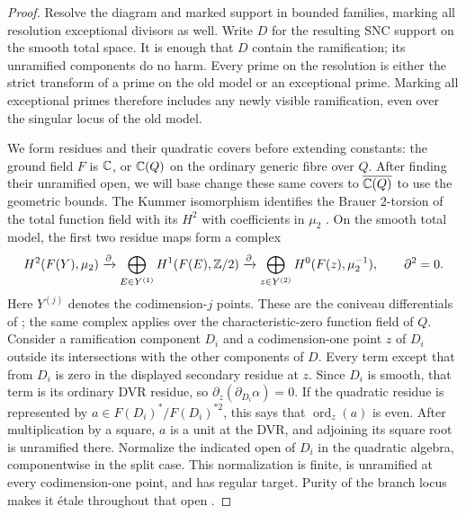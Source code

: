 \begin{proof}
Resolve the diagram and marked support in bounded families, marking all
resolution exceptional divisors as well.  Write $D$ for the resulting
SNC support on the smooth total space.  It is enough that $D$ contain
the ramification; its unramified components do no harm.  Every prime
on the resolution is either the strict transform of a prime on the
old model or an exceptional prime.  Marking all exceptional primes
therefore includes any newly visible ramification, even over the
singular locus of the old model.

We form residues and their quadratic covers before extending constants:
the ground field $F$ is $\mathbb C$, or $\mathbb C(Q)$ on the ordinary generic fibre
over $Q$.  After finding their unramified open, we will base change
these same covers to $\overline{\mathbb C(Q)}$ to use the geometric bounds.
The Kummer
isomorphism identifies the Brauer $2$-torsion of the total
function field with its $H^2$ with coefficients in $\mu_2$
\cite[\S2, equations~(1)--(4)]{AuelBohningBothmerPirutka20}.  On the
smooth total model, the first two residue maps form a complex
\[
 H^2(F(Y),\mu_2)
 \xrightarrow{\partial}
 \bigoplus_{E\in Y^{(1)}}H^1(F(E),\mathbb Z/2)
 \xrightarrow{\partial}
 \bigoplus_{z\in Y^{(2)}}H^0(F(z),\mu_2^{-1}),
 \qquad \partial^2=0.
\]
Here $Y^{(j)}$ denotes the codimension-$j$ points.  These are the
coniveau differentials of
\cite[Example~2.1 and Proposition~3.9]{BlochOgus74}; the same complex
applies over the characteristic-zero function field of $Q$.
Consider a ramification component $D_i$ and a codimension-one point
$z$ of $D_i$ outside its intersections with the other components of
$D$.  Every term except that from $D_i$ is zero in the displayed
secondary residue at $z$.  Since $D_i$ is smooth, that term is its
ordinary DVR residue, so $\partial_z(\partial_{D_i}\alpha)=0$.
If the quadratic residue is represented by
$a\in F(D_i)^*/F(D_i)^{*2}$, this says that
$\operatorname{ord}_z(a)$ is even.  After multiplication by a square,
$a$ is a unit at the DVR, and adjoining its square root is unramified
there.  Normalize the indicated open of $D_i$ in the quadratic
algebra, componentwise in the split case.  This normalization is
finite, is unramified at every codimension-one point, and has regular
target.  Purity of the branch locus makes it \'etale throughout that
open \cite[Lemma~58.21.4, Tag~0BMB]{StacksPurityBranch2026}.


\end{proof}

